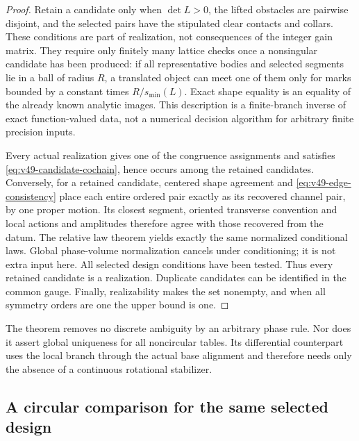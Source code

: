 \begin{proof}
Retain a candidate only when $\det L>0$, the lifted obstacles are
pairwise disjoint, and the selected pairs have the stipulated clear
contacts and collars.  These conditions are part of realization, not
consequences of the integer gain matrix.  They require only finitely
many lattice checks once a nonsingular candidate has been produced:
if all representative bodies and selected segments lie in a ball of
radius $R$, a translated object can meet one of them only for marks
bounded by a constant times $R/s_{\min}(L)$.  Exact shape equality is
an equality of the already known analytic images.  This description is
a finite-branch inverse of exact function-valued data, not a numerical
decision algorithm for arbitrary finite precision inputs.

Every actual realization gives one of the congruence assignments and
satisfies \eqref{eq:v49-candidate-cochain}, hence occurs among the
retained candidates.  Conversely, for a retained candidate, centered
shape agreement and \eqref{eq:v49-edge-consistency} place each entire
ordered pair exactly as its recovered channel pair, by one proper
motion.  Its closest segment, oriented transverse convention and local
actions and amplitudes therefore agree with those recovered from the
datum.  The relative law theorem yields exactly the same normalized
conditional laws.  Global phase-volume normalization cancels under
conditioning; it is not extra input here.  All selected design
conditions have been tested.  Thus every retained candidate is a
realization.  Duplicate candidates can be identified in the common
gauge.  Finally, realizability makes the set nonempty, and when all
symmetry orders are one the upper bound is one.
\end{proof}

The theorem removes no discrete ambiguity by an arbitrary phase rule.
Nor does it assert global uniqueness for all noncircular tables.
Its differential counterpart uses the local branch through the actual
base alignment and therefore needs only the absence of a continuous
rotational stabilizer.

\subsection{A circular comparison for the same selected design}

